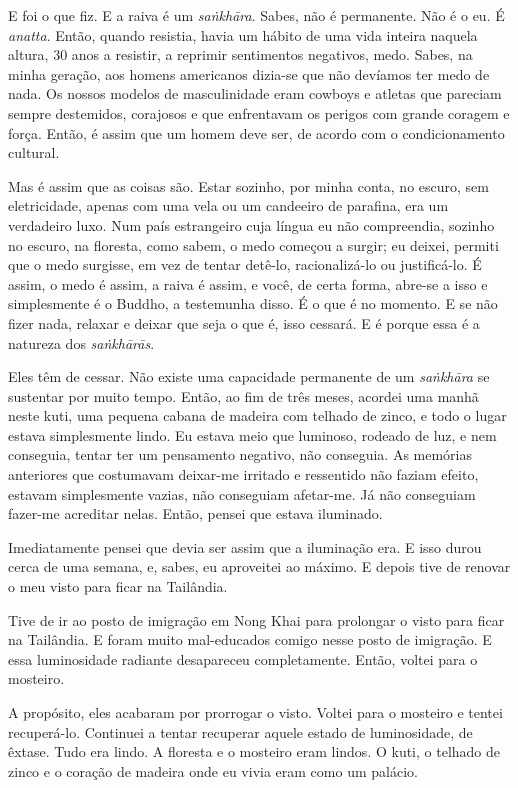 E foi o que fiz. E a raiva é um \emph{saṅkhāra}. Sabes, não é permanente. Não é o eu.
É \emph{anatta}. Então, quando resistia, havia um hábito de uma vida inteira naquela
altura, 30 anos a resistir, a reprimir sentimentos negativos, medo. Sabes, na
minha geração, aos homens americanos dizia-se que não devíamos ter medo de
nada. Os nossos modelos de masculinidade eram cowboys e atletas que pareciam
sempre destemidos, corajosos e que enfrentavam os perigos com grande coragem e
força. Então, é assim que um homem deve ser, de acordo com o condicionamento
cultural.

Mas é assim que as coisas são. Estar sozinho, por minha conta, no escuro, sem
eletricidade, apenas com uma vela ou um candeeiro de parafina, era um verdadeiro
luxo. Num país estrangeiro cuja língua eu não compreendia, sozinho no escuro, na
floresta, como sabem, o medo começou a surgir; eu deixei, permiti que o medo
surgisse, em vez de tentar detê-lo, racionalizá-lo ou justificá-lo. É assim,
o medo é assim, a raiva é assim, e você, de certa forma, abre-se a isso e
simplesmente é o Buddho, a testemunha disso. É o que é no momento. E se não
fizer nada, relaxar e deixar que seja o que é, isso cessará. E é porque essa é a
natureza dos \emph{saṅkhārās}.

Eles têm de cessar. Não existe uma capacidade permanente de um \emph{saṅkhāra} se
sustentar por muito tempo. Então, ao fim de três meses, acordei uma manhã neste
kuti, uma pequena cabana de madeira com telhado de zinco, e todo o lugar estava
simplesmente lindo. Eu estava meio que luminoso, rodeado de luz, e nem
conseguia, tentar ter um pensamento negativo, não conseguia. As memórias
anteriores que costumavam deixar-me irritado e ressentido não faziam efeito,
estavam simplesmente vazias, não conseguiam afetar-me. Já não conseguiam
fazer-me acreditar nelas. Então, pensei que estava iluminado.

Imediatamente pensei que devia ser assim que a iluminação era. E isso durou
cerca de uma semana, e, sabes, eu aproveitei ao máximo. E depois tive de renovar
o meu visto para ficar na Tailândia.

Tive de ir ao posto de imigração em Nong Khai para prolongar o visto para ficar na
Tailândia. E foram muito mal-educados comigo nesse posto de imigração. E essa
luminosidade radiante desapareceu completamente. Então, voltei para o mosteiro.

A propósito, eles acabaram por prorrogar o visto. Voltei para o mosteiro e
tentei recuperá-lo. Continuei a tentar recuperar aquele estado de luminosidade,
de êxtase. Tudo era lindo. A floresta e o mosteiro eram lindos. O kuti, o
telhado de zinco e o coração de madeira onde eu vivia eram como um palácio.

